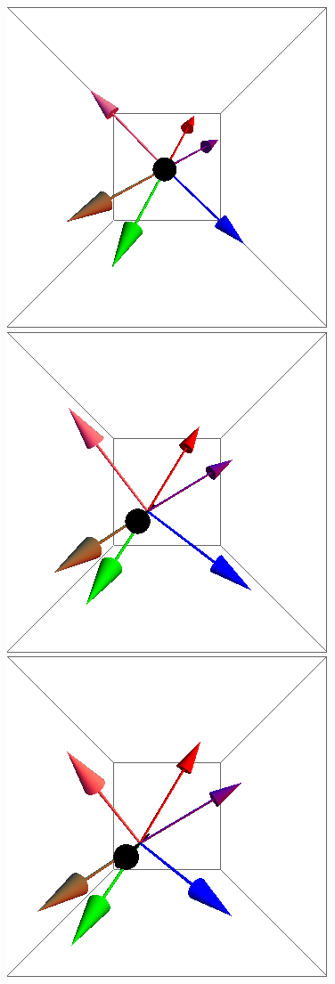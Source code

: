 \documentclass{article}
\begin{document}
\begin{figure}[ht]
\includegraphics[scale=0.28]{100/55S000to005G.png}
\includegraphics[scale=0.28]{100/419S000to005G.png}
\includegraphics[scale=0.28]{100/466S000to005G.png}

\end{figure}
\end{document}

